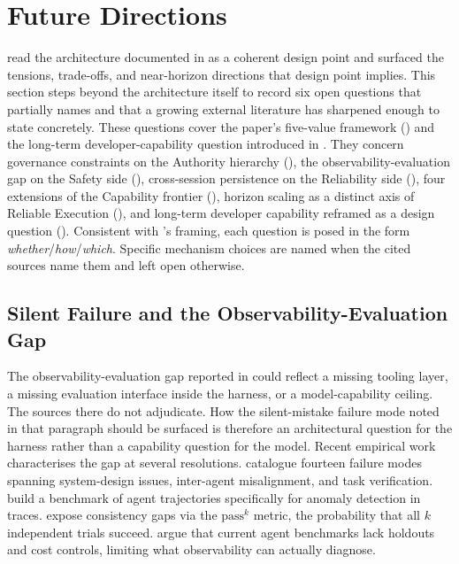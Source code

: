 \section{Future Directions}
\label{sec:future}

 read the architecture documented in  as a coherent design point and surfaced the tensions, trade-offs, and near-horizon directions that design point implies. This section steps beyond the architecture itself to record six open questions that  partially names and that a growing external literature has sharpened enough to state concretely. These questions cover the paper's five-value framework () and the long-term developer-capability question introduced in . They concern governance constraints on the Authority hierarchy (), the observability-evaluation gap on the Safety side (), cross-session persistence on the Reliability side (), four extensions of the Capability frontier (), horizon scaling as a distinct axis of Reliable Execution (), and long-term developer capability reframed as a design question (). Consistent with 's framing, each question is posed in the form \emph{whether}/\emph{how}/\emph{which}. Specific mechanism choices are named when the cited sources name them and left open otherwise.

\subsection{Silent Failure and the Observability-Evaluation Gap}
\label{sec:future:evaluation}

The observability-evaluation gap reported in  could reflect a missing tooling layer, a missing evaluation interface inside the harness, or a model-capability ceiling. The sources there do not adjudicate. How the silent-mistake failure mode noted in that paragraph should be surfaced is therefore an architectural question for the harness rather than a capability question for the model. Recent empirical work characterises the gap at several resolutions. \citet{cemri2025massfail} catalogue fourteen failure modes spanning system-design issues, inter-agent misalignment, and task verification. \citet{pathak2025silentmultiagent} build a benchmark of agent trajectories specifically for anomaly detection in traces. \citet{yao2024taubench} expose consistency gaps via the $\text{pass}^k$ metric, the probability that all $k$ independent trials succeed. \citet{kapoor2024agentsthatmatter} argue that current agent benchmarks lack holdouts and cost controls, limiting what observability can actually diagnose.

